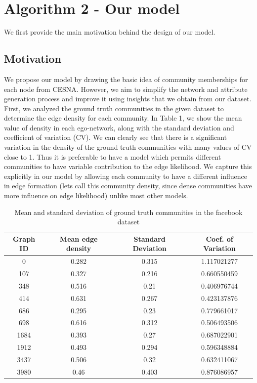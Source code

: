 \documentclass[11pt]{article}
\begin{document}
\section{Algorithm 2 - Our model}
We first provide the main motivation behind the design of our model.
\subsection{Motivation}
We propose our model by drawing the basic idea of community memberships for each node from CESNA. However, we aim to simplify the network and attribute generation process and improve it using insights that we obtain from our dataset. First, we analyzed the ground truth communities in the given dataset to determine the edge density for each community. In Table 1, we show the mean value of density in each ego-network, along with the standard deviation and coefficient of variation (CV).  We can clearly see that there is a significant variation in the density of the ground truth communities with many values of CV close to 1. Thus it is preferable to have a model which permits different communities to have variable contribution to the edge likelihood. We capture this explicitly in our model by allowing each community to have a different influence in edge formation (lets call this community density, since dense communities have more influence on edge likelihood) unlike most other models.  \\[3pt]

\begin{table}[H]
\begin{center}
\begin{tabular}{|c|c|c|c|}
\hline
\textbf{Graph ID} &	\textbf{Mean edge density}	& \textbf{Standard  Deviation} & \textbf{Coef. of Variation}	 \\ \hline
0	& 0.282	& 0.315	& 1.117021277 \\ \hline
107	& 0.327	& 0.216	& 0.660550459 \\ \hline
348	& 0.516	& 0.21	& 0.406976744 \\ \hline
414	& 0.631	& 0.267	& 0.423137876 \\ \hline
686	& 0.295	& 0.23	& 0.779661017 \\ \hline
698	& 0.616	& 0.312	& 0.506493506 \\ \hline
1684	& 0.393	& 0.27	& 0.687022901 \\ \hline
1912	& 0.493	& 0.294	& 0.596348884 \\ \hline
3437	& 0.506	& 0.32	& 0.632411067 \\ \hline
3980	&0.46	& 0.403	& 0.876086957 \\ \hline
\end{tabular}
\end{center}
\caption{Mean and standard deviation of ground truth communities in the facebook dataset}
\end{table}
\end{document}
